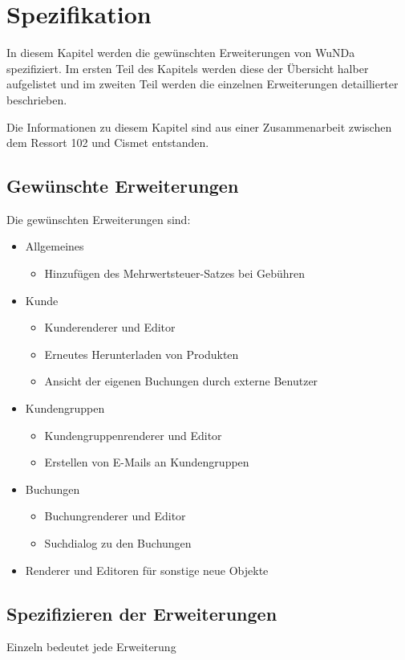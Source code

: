 \chapter{Spezifikation}
In diesem Kapitel werden die gewünschten Erweiterungen von \ac{WuNDa} spezifiziert. Im ersten Teil des Kapitels werden diese der Übersicht halber aufgelistet und im zweiten Teil werden die einzelnen Erweiterungen detaillierter beschrieben.

Die Informationen zu diesem Kapitel sind aus einer Zusammenarbeit zwischen dem Ressort 102 und Cismet entstanden. 
\section{Gewünschte Erweiterungen}
Die gewünschten Erweiterungen sind:
\begin{itemize}
	\item Allgemeines
	\begin{itemize}
		\item Hinzufügen des Mehrwertsteuer-Satzes bei Gebühren
	\end{itemize}
	\item Kunde
	\begin{itemize}
		\item Kunderenderer und Editor
		\item Erneutes Herunterladen von Produkten
		\item Ansicht der eigenen Buchungen durch externe Benutzer
	\end{itemize}
	\item Kundengruppen
	\begin{itemize}
		\item Kundengruppenrenderer und Editor
		\item Erstellen von E-Mails an Kundengruppen
	\end{itemize}
	\item Buchungen
	\begin{itemize}
		\item Buchungrenderer und Editor
		\item Suchdialog zu den Buchungen
	\end{itemize}    
	\item Renderer und Editoren für sonstige neue Objekte
\end{itemize}




\section{Spezifizieren der Erweiterungen}
Einzeln bedeutet jede Erweiterung
